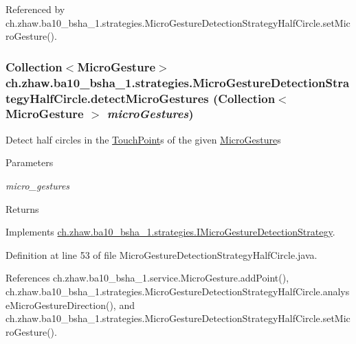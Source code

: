 Referenced by ch.zhaw.ba10\_\-bsha\_\-1.strategies.MicroGestureDetectionStrategyHalfCircle.setMicroGesture().\hypertarget{classch_1_1zhaw_1_1ba10__bsha__1_1_1strategies_1_1MicroGestureDetectionStrategyHalfCircle_a780f7ded471f8e1dbd141518c41c060e}{
\subsubsection[{detectMicroGestures}]{\setlength{\rightskip}{0pt plus 5cm}Collection$<${\bf MicroGesture}$>$ ch.zhaw.ba10\_\-bsha\_\-1.strategies.MicroGestureDetectionStrategyHalfCircle.detectMicroGestures (Collection$<$ {\bf MicroGesture} $>$ {\em microGestures})}}
\label{classch_1_1zhaw_1_1ba10__bsha__1_1_1strategies_1_1MicroGestureDetectionStrategyHalfCircle_a780f7ded471f8e1dbd141518c41c060e}
Detect half circles in the \hyperlink{classch_1_1zhaw_1_1ba10__bsha__1_1_1TouchPoint}{TouchPoint}s of the given \hyperlink{}{MicroGesture}s


\begin{DoxyParams}{Parameters}
\item[{\em micro\_\-gestures}]\end{DoxyParams}
\begin{DoxyReturn}{Returns}

\end{DoxyReturn}


Implements \hyperlink{interfacech_1_1zhaw_1_1ba10__bsha__1_1_1strategies_1_1IMicroGestureDetectionStrategy_a8593331fb67e5d4dc890d3db9f2d1b58}{ch.zhaw.ba10\_\-bsha\_\-1.strategies.IMicroGestureDetectionStrategy}.

Definition at line 53 of file MicroGestureDetectionStrategyHalfCircle.java.

References ch.zhaw.ba10\_\-bsha\_\-1.service.MicroGesture.addPoint(), ch.zhaw.ba10\_\-bsha\_\-1.strategies.MicroGestureDetectionStrategyHalfCircle.analyseMicroGestureDirection(), and ch.zhaw.ba10\_\-bsha\_\-1.strategies.MicroGestureDetectionStrategyHalfCircle.setMicroGesture().

